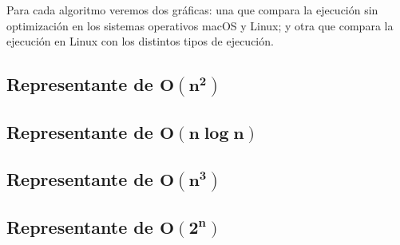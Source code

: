 \documentclass[11pt]{article}
\begin{document}
Para cada algoritmo veremos dos gráficas: una que compara la ejecución sin optimización en los sistemas operativos macOS y Linux; y otra que compara la ejecución en Linux con los distintos tipos de ejecución.

\subsection*{Representante de $\boldsymbol{O(n^2)}$}
	\begin{center}
		
	\end{center}

	\begin{center}
		
	\end{center}

\subsection*{Representante de $\boldsymbol{O(n\log n)}$}
	\begin{center}
		
	\end{center}

	\begin{center}
		
	\end{center}

\subsection*{Representante de $\boldsymbol{O(n^3)}$}
	\begin{center}
		
	\end{center}

	\begin{center}
		
	\end{center}

\subsection*{Representante de $\boldsymbol{O(2^n)}$}
	\begin{center}
		
	\end{center}

	\begin{center}
		
	\end{center}
	
\end{document}
